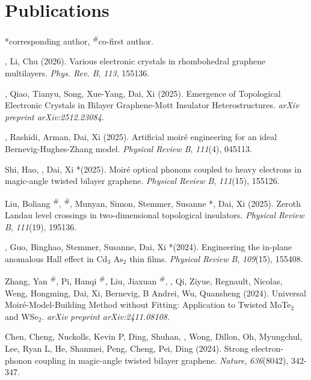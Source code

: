 \section{Publications}
\newcommand{\Revision}{\emph{under revision}}
\newcommand{\CS}{*} %
\newcommand{\CF}{\textsuperscript{\#}} %

\CS corresponding author, \CF co-first author.
\begin{etaremune}
\item \Me \CS, Li, Chu (2026).
	Various electronic crystals in rhombohedral graphene multilayers.
	\emph{Phys. Rev. B}, \emph{113}, 155136.

\item \Me, Qiao, Tianyu, Song, Xue-Yang, Dai, Xi (2025).
	Emergence of Topological Electronic Crystals in Bilayer Graphene-Mott Insulator Heterostructures.
	\emph{arXiv preprint arXiv:2512.23084}.

\item \Me, Rashidi, Arman, Dai, Xi (2025).
	Artificial moiré engineering for an ideal Bernevig-Hughes-Zhang model.
	\emph{Physical Review B}, \emph{111}(4), 045113.

\item Shi, Hao, \Me, Dai, Xi \CS (2025).
	Moiré optical phonons coupled to heavy electrons in magic-angle twisted bilayer graphene.
	\emph{Physical Review B}, \emph{111}(15), 155126.

\item Liu, Boliang \CF, \Me \CF, Munyan, Simon, Stemmer, Susanne \CS, Dai, Xi (2025).
	Zeroth Landau level crossings in two-dimensional topological insulators.
	\emph{Physical Review B}, \emph{111}(19), 195136.

\item \Me, Guo, Binghao, Stemmer, Susanne, Dai, Xi \CS (2024).
	Engineering the in-plane anomalous Hall effect in Cd$_3$ As$_2$ thin films.
	\emph{Physical Review B}, \emph{109}(15), 155408.

\item Zhang, Yan \CF, Pi, Hanqi \CF, Liu, Jiaxuan \CF, \Me, Qi, Ziyue, Regnault, Nicolas, Weng, Hongming, Dai, Xi, Bernevig, B Andrei, Wu, Quansheng (2024).
	Universal Moir\'e-Model-Building Method without Fitting: Application to Twisted MoTe$_2 $ and WSe$_2$.
	\emph{arXiv preprint arXiv:2411.08108}.

\item Chen, Cheng, Nuckolls, Kevin P, Ding, Shuhan, \Me, Wong, Dillon, Oh, Myungchul, Lee, Ryan L, He, Shanmei, Peng, Cheng, Pei, Ding (2024).
	Strong electron-phonon coupling in magic-angle twisted bilayer graphene.
	\emph{Nature}, \emph{636}(8042), 342-347.


\end{etaremune}
